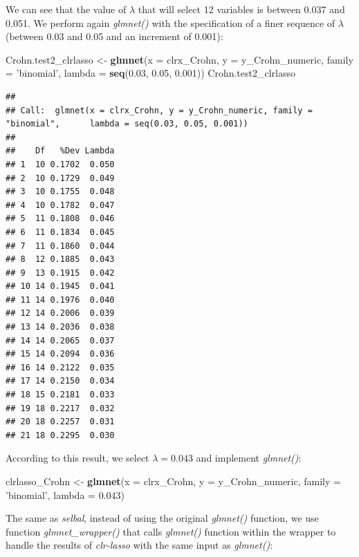 \documentclass[openany]{book}
\newenvironment{Shaded}{\begin{snugshade}}{\end{snugshade}}
\newcommand{\KeywordTok}[1]{\textcolor[rgb]{0.13,0.29,0.53}{\textbf{#1}}}
\newcommand{\DataTypeTok}[1]{\textcolor[rgb]{0.13,0.29,0.53}{#1}}
\newcommand{\FloatTok}[1]{\textcolor[rgb]{0.00,0.00,0.81}{#1}}
\newcommand{\StringTok}[1]{\textcolor[rgb]{0.31,0.60,0.02}{#1}}
\newcommand{\NormalTok}[1]{#1}
\begin{document}
We can see that the value of \(\lambda\) that will select 12 variables
is between 0.037 and 0.051. We perform again \emph{glmnet()} with the
specification of a finer sequence of \(\lambda\) (between 0.03 and 0.05
and an increment of 0.001):

\begin{Shaded}
\begin{Highlighting}[]
\NormalTok{Crohn.test2_clrlasso <-}\StringTok{ }\KeywordTok{glmnet}\NormalTok{(}\DataTypeTok{x =}\NormalTok{ clrx_Crohn, }\DataTypeTok{y =}\NormalTok{ y_Crohn_numeric, }
                               \DataTypeTok{family =} \StringTok{'binomial'}\NormalTok{, }\DataTypeTok{lambda =} \KeywordTok{seq}\NormalTok{(}\FloatTok{0.03}\NormalTok{, }\FloatTok{0.05}\NormalTok{, }\FloatTok{0.001}\NormalTok{))}
\NormalTok{Crohn.test2_clrlasso}
\end{Highlighting}
\end{Shaded}

\begin{verbatim}
## 
## Call:  glmnet(x = clrx_Crohn, y = y_Crohn_numeric, family = "binomial",      lambda = seq(0.03, 0.05, 0.001)) 
## 
##    Df   %Dev Lambda
## 1  10 0.1702  0.050
## 2  10 0.1729  0.049
## 3  10 0.1755  0.048
## 4  10 0.1782  0.047
## 5  11 0.1808  0.046
## 6  11 0.1834  0.045
## 7  11 0.1860  0.044
## 8  12 0.1885  0.043
## 9  13 0.1915  0.042
## 10 14 0.1945  0.041
## 11 14 0.1976  0.040
## 12 14 0.2006  0.039
## 13 14 0.2036  0.038
## 14 14 0.2065  0.037
## 15 14 0.2094  0.036
## 16 14 0.2122  0.035
## 17 14 0.2150  0.034
## 18 15 0.2181  0.033
## 19 18 0.2217  0.032
## 20 18 0.2257  0.031
## 21 18 0.2295  0.030
\end{verbatim}

According to this result, we select \(\lambda = 0.043\) and implement
\emph{glmnet()}:

\begin{Shaded}
\begin{Highlighting}[]
\NormalTok{clrlasso_Crohn <-}\StringTok{ }\KeywordTok{glmnet}\NormalTok{(}\DataTypeTok{x =}\NormalTok{ clrx_Crohn, }\DataTypeTok{y =}\NormalTok{ y_Crohn_numeric, }
                         \DataTypeTok{family =} \StringTok{'binomial'}\NormalTok{, }\DataTypeTok{lambda =} \FloatTok{0.043}\NormalTok{)}
\end{Highlighting}
\end{Shaded}

The same as \emph{selbal}, instead of using the original \emph{glmnet()}
function, we use function \emph{glmnet\_wrapper()} that calls
\emph{glmnet()} function within the wrapper to handle the results of
\emph{clr-lasso} with the same input as \emph{glmnet()}:
\end{document}
